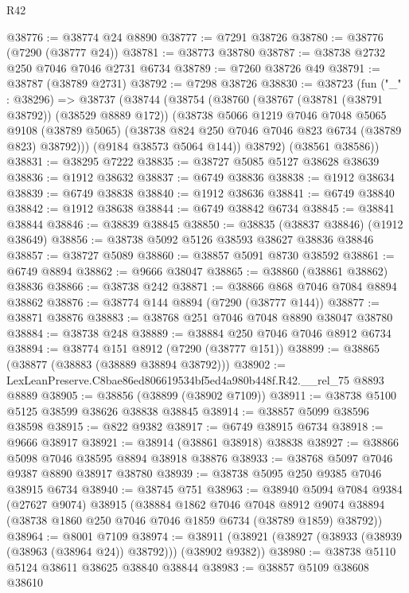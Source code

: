 \begin{lexlean}{R42}
\begin{coremodule}
{@38776 := @38774 @24 @8890
@38777 := @7291 @38726
@38780 := @38776 (@7290 (@38777 @24))
@38781 := @38773 @38780
@38787 := @38738 @2732 @250 @7046 @7046 @2731 @6734
@38789 := @7260 @38726 @49
@38791 := @38787 (@38789 @2731)
@38792 := @7298 @38726
@38830 := @38723
    (fun ("_" : @38296) =>
    @38737
      (@38744
        (@38754
          (@38760
            (@38767 (@38781 (@38791 @38792)) (@38529 @8889 @172))
            (@38738
              @5066
              @1219
              @7046
              @7048
              @5065
              @9108
              (@38789 @5065)
              (@38738 @824 @250 @7046 @7046 @823 @6734 (@38789 @823) @38792)))
          (@9184 @38573 @5064 @144))
        @38792)
      (@38561 @38586))
@38831 := @38295 @7222
@38835 := @38727 @5085 @5127 @38628 @38639
@38836 := @1912 @38632
@38837 := @6749 @38836
@38838 := @1912 @38634
@38839 := @6749 @38838
@38840 := @1912 @38636
@38841 := @6749 @38840
@38842 := @1912 @38638
@38844 := @6749 @38842 @6734
@38845 := @38841 @38844
@38846 := @38839 @38845
@38850 := @38835 (@38837 @38846) (@1912 @38649)
@38856 := @38738 @5092 @5126 @38593 @38627 @38836 @38846
@38857 := @38727 @5089
@38860 := @38857 @5091 @8730 @38592
@38861 := @6749 @8894
@38862 := @9666 @38047
@38865 := @38860 (@38861 @38862) @38836
@38866 := @38738 @242
@38871 := @38866 @868 @7046 @7084 @8894 @38862
@38876 := @38774 @144 @8894 (@7290 (@38777 @144))
@38877 := @38871 @38876
@38883 := @38768 @251 @7046 @7048 @8890 @38047 @38780
@38884 := @38738 @248
@38889 := @38884 @250 @7046 @7046 @8912 @6734
@38894 := @38774 @151 @8912 (@7290 (@38777 @151))
@38899 := @38865 (@38877 (@38883 (@38889 @38894 @38792)))
@38902 := LexLeanPreserve.C8bae86ed806619534bf5ed4a980b448f.R42.__rel_75 @8893 @8889
@38905 := @38856 (@38899 (@38902 @7109))
@38911 := @38738 @5100 @5125 @38599 @38626 @38838 @38845
@38914 := @38857 @5099 @38596 @38598
@38915 := @822 @9382
@38917 := @6749 @38915 @6734
@38918 := @9666 @38917
@38921 := @38914 (@38861 @38918) @38838
@38927 := @38866 @5098 @7046 @38595 @8894 @38918 @38876
@38933 := @38768 @5097 @7046 @9387 @8890 @38917 @38780
@38939 := @38738 @5095 @250 @9385 @7046 @38915 @6734
@38940 := @38745 @751
@38963 := @38940
    @5094
    @7084
    @9384
    (@27627 @9074)
    @38915
    (@38884
      @1862
      @7046
      @7048
      @8912
      @9074
      @38894
      (@38738 @1860 @250 @7046 @7046 @1859 @6734 (@38789 @1859) @38792))
@38964 := @8001 @7109
@38974 := @38911 (@38921 (@38927 (@38933 (@38939 (@38963 (@38964 @24)) @38792))) (@38902 @9382))
@38980 := @38738 @5110 @5124 @38611 @38625 @38840 @38844
@38983 := @38857 @5109 @38608 @38610
}
\end{coremodule}
\end{lexlean}
